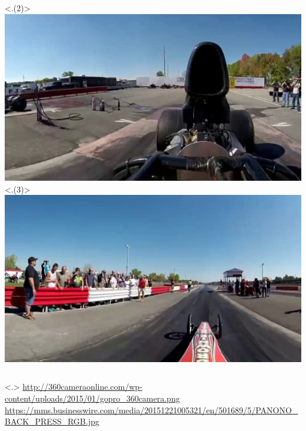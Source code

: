 \begin{frame}[c]
\begin{minipage}[t][7cm][t]{\textwidth}
{\begin{columns}[T]
\begin{column}{0.5\linewidth}
               \only<.(2)>{\hspace{2cm}\includegraphics[scale=0.065]{videos/fov1.png}}
               \only<.(3)>{\hspace{2cm}\includegraphics[scale=0.065]{videos/fov2.png}}
            \end{column}
         \end{columns}
         \onslide<.>{
         \vspace{-0.75cm}
         {
            \tiny
            \url{http://360cameraonline.com/wp-content/uploads/2015/01/gopro_360camera.png}
         }\\

         {\vspace{-0.75cm}
            \tiny \url{https://mms.businesswire.com/media/20151221005321/en/501689/5/PANONO_BACK_PRESS_RGB.jpg}
         }
         }
      }
    \end{minipage}
    \vfill
\end{frame}

